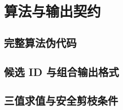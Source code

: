 \section{算法与输出契约}
\mbox{}\par
\subsection{完整算法伪代码}
\mbox{}\par
\subsection{候选 ID 与组合输出格式}
\mbox{}\par
\subsection{三值求值与安全剪枝条件}
\mbox{}\par
